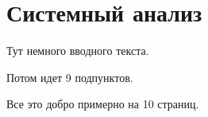 \section{Системный анализ}

Тут немного вводного текста.

Потом идет 9 подпунктов.

Все это добро примерно на 10 страниц.

\clearpage
